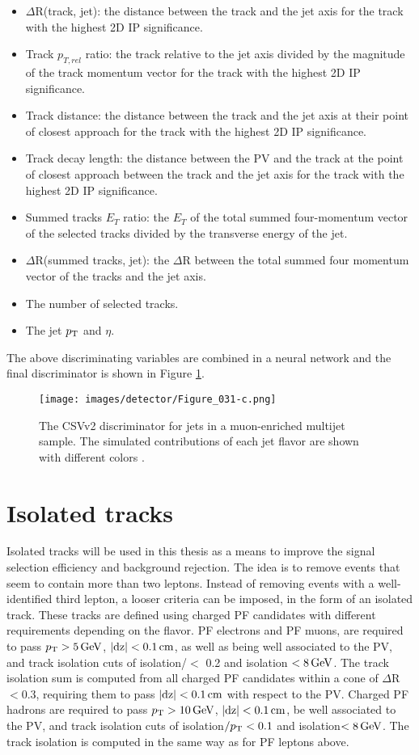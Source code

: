 \begin{itemize}
\item $\Delta$R(track, jet): the distance between the track and the jet axis for the track with the highest 2D IP significance.
\item Track $p_{T,rel}$ ratio: the track \pt relative to the jet axis divided by the magnitude of the track momentum vector for the track with the highest 2D IP significance.
\item Track distance: the distance between the track and the jet axis at their point of closest approach for the track with the highest 2D IP significance.
\item Track decay length: the distance between the PV and the track at the point of closest approach between the track and the jet axis for the track with the highest 2D IP significance.
\item Summed tracks $E_T$ ratio: the $E_T$ of the total summed four-momentum vector of the selected tracks divided by the transverse energy of the jet.
\item $\Delta$R(summed tracks, jet): the $\Delta$R between the total summed four momentum vector of the tracks and the jet axis.
\item The number of selected tracks.
\item The jet $p_{\mathrm{T}}$ and $\eta$.
\end{itemize}
\newpara
\noindent\justify
The above discriminating variables are combined in a neural network and the final discriminator is shown in Figure \ref{fig:CSVv2}.
\begin{figure}[!h]
\centering
\texttt{[image: images/detector/Figure\_031-c.png]}\\
\caption{The CSVv2 discriminator for jets in a muon-enriched multijet sample. The simulated contributions of each jet flavor are shown with different colors \cite{Sirunyan:2017ezt}.}
\label{fig:CSVv2}
\end{figure}
\section{Isolated tracks}\label{sec:isotracks}
\noindent
\justify
Isolated tracks will be used in this thesis as a means to improve the signal selection efficiency and background rejection. 
The idea is to remove events that seem to contain more than two leptons. 
Instead of removing events with a well-identified third lepton, a looser criteria can be imposed, in the form of an isolated track.
These tracks are defined using charged PF candidates with different requirements depending on the flavor. 
PF electrons and PF muons, are required to pass $p_{\mathrm{T}}>5\,\text{Ge\hspace{-.08em}V}$, $|\mathrm{dz}|<0.1\,\text{cm}$, as well as being well associated to the PV, and track isolation cuts of isolation/\pt $<$ 0.2 and isolation $<8\,\text{Ge\hspace{-.08em}V}$. 
The track isolation sum is computed from all charged PF candidates within a cone of $\Delta$R$<0.3$, requiring them to pass $|\mathrm{dz}|<0.1\,\text{cm}$ with respect to the PV. 
Charged PF hadrons are required to pass $p_{\mathrm{T}}>10\,\text{Ge\hspace{-.08em}V}$, $|\mathrm{dz}|<0.1\,\text{cm}$, be well associated to the PV, and track isolation cuts of isolation$/p_{\mathrm{T}}<0.1$ and isolation$<8\,\text{Ge\hspace{-.08em}V}$. 
The track isolation is computed in the same way as for PF leptons above.

